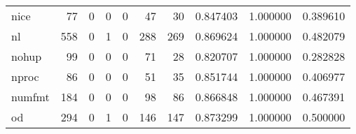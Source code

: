 \begin{longtable}{lrrrrrrrrr}
nice      &                                    77 &                                                  0 &                                                  0 &                                                  0 &                                                 47 &                                                 30 &                                           0.847403 &                               1.000000 &                             0.389610 \\
nl        &                                   558 &                                                  0 &                                                  1 &                                                  0 &                                                288 &                                                269 &                                           0.869624 &                               1.000000 &                             0.482079 \\
nohup     &                                    99 &                                                  0 &                                                  0 &                                                  0 &                                                 71 &                                                 28 &                                           0.820707 &                               1.000000 &                             0.282828 \\
nproc     &                                    86 &                                                  0 &                                                  0 &                                                  0 &                                                 51 &                                                 35 &                                           0.851744 &                               1.000000 &                             0.406977 \\
numfmt    &                                   184 &                                                  0 &                                                  0 &                                                  0 &                                                 98 &                                                 86 &                                           0.866848 &                               1.000000 &                             0.467391 \\
od        &                                   294 &                                                  0 &                                                  1 &                                                  0 &                                                146 &                                                147 &                                           0.873299 &                               1.000000 &                             0.500000 \\

\end{longtable}
